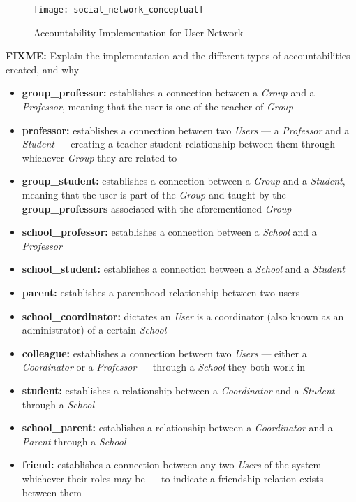 \begin{figure}[H]
  \centering
  \texttt{[image: social\_network\_conceptual]}
  \caption{Accountability Implementation for User Network}
  \label{fig:social_network_conceptual}
\end{figure}

\textbf{FIXME:} Explain the implementation and the different types of accountabilities created, and why

\begin{itemize}
  \item \textbf{group\_professor:} establishes a connection between a \emph{Group} and a \emph{Professor}, meaning that the user is one of the teacher of \emph{Group}
  \item \textbf{professor:} establishes a connection between two \emph{Users} --- a \emph{Professor} and a \emph{Student} --- creating a teacher-student relationship between them through whichever \emph{Group} they are related to
  \item \textbf{group\_student:} establishes a connection between a \emph{Group} and a \emph{Student}, meaning that the user is part of the \emph{Group} and taught by the \textbf{group\_professors} associated with the aforementioned \emph{Group}
  \item \textbf{school\_professor:} establishes a connection between a \emph{School} and a \emph{Professor}
  \item \textbf{school\_student:} establishes a connection between a \emph{School} and a \emph{Student}
  \item \textbf{parent:} establishes a parenthood relationship between two users
  \item \textbf{school\_coordinator:} dictates an \emph{User} is a coordinator (also known as an administrator) of a certain \emph{School}
  \item \textbf{colleague:} establishes a connection between two \emph{Users} --- either a \emph{Coordinator} or a \emph{Professor} --- through a \emph{School} they both work in
  \item \textbf{student:} establishes a relationship between a \emph{Coordinator} and a \emph{Student} through a \emph{School}
  \item \textbf{school\_parent:} establishes a relationship between a \emph{Coordinator} and a \emph{Parent} through a \emph{School}
  \item \textbf{friend:} establishes a connection between any two \emph{Users} of the system --- whichever their roles may be --- to indicate a friendship relation exists between them
\end{itemize}


